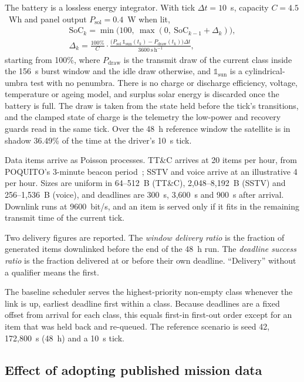 \documentclass[preprint,12pt]{elsarticle}
\newcommand{\ttc}{TT\&C}
\begin{document}
The battery is a lossless energy integrator. With tick $\Delta t = 10$~s, capacity $C = 4.5$~Wh and panel output $P_\mathrm{sol} = 0.4$~W when lit,
\begin{gather}
\mathrm{SoC}_k = \min\bigl(100,\ \max(0,\ \mathrm{SoC}_{k-1} + \Delta_k)\bigr), \\
\Delta_k = \frac{100\%}{C}\cdot\frac{\bigl(P_\mathrm{sol}\,\mathbb{1}_\mathrm{sun}(t_k) - P_\mathrm{draw}(t_k)\bigr)\Delta t}{3600~\mathrm{s\,h^{-1}}},
\end{gather}
starting from 100\%, where $P_\mathrm{draw}$ is the transmit draw of the current class inside the 156~s burst window and the idle draw otherwise, and $\mathbb{1}_\mathrm{sun}$ is a cylindrical-umbra test with no penumbra. There is no charge or discharge efficiency, voltage, temperature or ageing model, and surplus solar energy is discarded once the battery is full. The draw is taken from the state held before the tick's transitions, and the clamped state of charge is the telemetry the low-power and recovery guards read in the same tick. Over the 48~h reference window the satellite is in shadow 36.49\% of the time at the driver's 10~s tick.

Data items arrive as Poisson processes. \ttc{} arrives at 20 items per hour, from POQUITO's 3-minute beacon period~\cite{Franzese2024POQUITO4S}; SSTV and voice arrive at an illustrative 4 per hour. Sizes are uniform in 64--512~B (\ttc{}), 2,048--8,192~B (SSTV) and 256--1,536~B (voice), and deadlines are 300~s, 3,600~s and 900~s after arrival. Downlink runs at 9600~bit/s, and an item is served only if it fits in the remaining transmit time of the current tick.

Two delivery figures are reported. The \emph{window delivery ratio} is the fraction of generated items downlinked before the end of the 48~h run. The \emph{deadline success ratio} is the fraction delivered at or before their own deadline. ``Delivery'' without a qualifier means the first.

The baseline scheduler serves the highest-priority non-empty class whenever the link is up, earliest deadline first within a class. Because deadlines are a fixed offset from arrival for each class, this equals first-in first-out order except for an item that was held back and re-queued. The reference scenario is seed 42, 172,800~s (48~h) and a 10~s tick.

\subsection{Effect of adopting published mission data}
\end{document}
